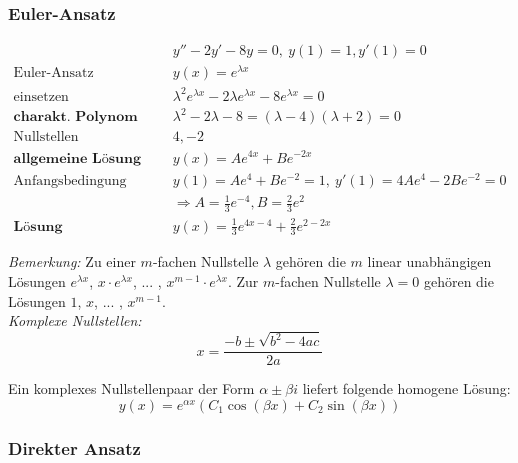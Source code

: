 \documentclass[11pt]{article}
\begin{document}
\clearpage

\subsubsection{Euler-Ansatz}

\begin{equation*}
\begin{split}
	& y'' - 2y' - 8y = 0,\ y(1) = 1, y'(1) = 0 \\
	\text{Euler-Ansatz}\quad & y(x) = e^{\lambda x} \\
	\text{einsetzen}\quad & \lambda^2 e^{\lambda x} - 2\lambda e^{\lambda x} - 8e^{\lambda x} = 0 \\
	\textbf{charakt. Polynom}\quad & \lambda^2 - 2\lambda - 8 = (\lambda - 4)(\lambda + 2) = 0 \\
	\text{Nullstellen}\quad & 4, -2 \\
	\textbf{allgemeine L{\"o}sung}\quad & y(x) = Ae^{4x} + Be^{-2x} \\
	\text{Anfangsbedingung gebrauchen}\quad & y(1) = Ae^4 + Be^{-2} = 1,\ y'(1) = 4Ae^4 - 2Be^{-2} = 0 \\
											& \Rightarrow A = \frac{1}{3}e^{-4}, B = \frac{2}{3}e^2 \\
	\textbf{L{\"o}sung}\quad & y(x) = \frac{1}{3}e^{4x-4} + \frac{2}{3}e^{2-2x}
\end{split}
\end{equation*}

\emph{Bemerkung:} Zu einer $m$-fachen Nullstelle $\lambda$ geh{\"o}ren die $m$ linear unabh{\"a}ngigen L{\"o}sungen $e^{\lambda x}$, $x\cdot e^{\lambda x}$, ... , $x^{m-1}\cdot e^{\lambda x}$. Zur $m$-fachen Nullstelle $\lambda = 0$ geh{\"o}ren die L{\"o}sungen $1$, $x$, ... , $x^{m-1}$. \\
 
\emph{Komplexe Nullstellen:} \\

\begin{equation*}
	x = \frac{-b \pm \sqrt{b^2-4ac}}{2a}
\end{equation*}

Ein komplexes Nullstellenpaar der Form $\alpha \pm \beta i$ liefert folgende homogene L{\"o}sung:
\begin{equation*}
	y(x)=e^{\alpha x}(C_1\cos(\beta x) + C_2\sin(\beta x))
\end{equation*}

\clearpage

\subsubsection{Direkter Ansatz}
\end{document}

